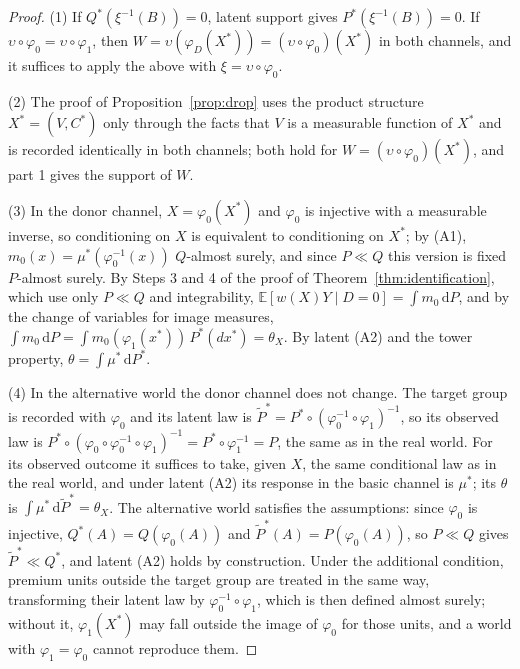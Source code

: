 \documentclass[11pt,a4paper]{article}
\newcommand{\E}{\mathbb{E}}
\newcommand{\dd}{\,\mathrm{d}}
\theoremstyle{plain}
\theoremstyle{definition}
\begin{document}
\begin{proof}
(1) If $Q^*(\xi^{-1}(B))=0$, latent support gives $P^*(\xi^{-1}(B))=0$. If $\upsilon\circ\varphi_0=\upsilon\circ\varphi_1$, then $W=\upsilon(\varphi_D(X^*))=(\upsilon\circ\varphi_0)(X^*)$ in both channels, and it suffices to apply the above with $\xi=\upsilon\circ\varphi_0$.

(2) The proof of Proposition~\ref{prop:drop} uses the product structure $X^*=(V,C^*)$ only through the facts that $V$ is a measurable function of $X^*$ and is recorded identically in both channels; both hold for $W=(\upsilon\circ\varphi_0)(X^*)$, and part 1 gives the support of $W$.

(3) In the donor channel, $X=\varphi_0(X^*)$ and $\varphi_0$ is injective with a measurable inverse, so conditioning on $X$ is equivalent to conditioning on $X^*$; by (A1), $m_0(x)=\mu^*(\varphi_0^{-1}(x))$ $Q$-almost surely, and since $P\ll Q$ this version is fixed $P$-almost surely. By Steps 3 and 4 of the proof of Theorem~\ref{thm:identification}, which use only $P\ll Q$ and integrability, $\E[w(X)Y\mid D=0]=\int m_0\dd P$, and by the change of variables for image measures, $\int m_0\dd P=\int m_0(\varphi_1(x^*))\,P^*(dx^*)=\theta_X$. By latent (A2) and the tower property, $\theta=\int\mu^*\dd P^*$.

(4) In the alternative world the donor channel does not change. The target group is recorded with $\varphi_0$ and its latent law is $\tilde P^*=P^*\circ(\varphi_0^{-1}\circ\varphi_1)^{-1}$, so its observed law is $P^*\circ(\varphi_0\circ\varphi_0^{-1}\circ\varphi_1)^{-1}=P^*\circ\varphi_1^{-1}=P$, the same as in the real world. For its observed outcome it suffices to take, given $X$, the same conditional law as in the real world, and under latent (A2) its response in the basic channel is $\mu^*$; its $\theta$ is $\int\mu^*\dd\tilde P^*=\theta_X$. The alternative world satisfies the assumptions: since $\varphi_0$ is injective, $Q^*(A)=Q(\varphi_0(A))$ and $\tilde P^*(A)=P(\varphi_0(A))$, so $P\ll Q$ gives $\tilde P^*\ll Q^*$, and latent (A2) holds by construction. Under the additional condition, premium units outside the target group are treated in the same way, transforming their latent law by $\varphi_0^{-1}\circ\varphi_1$, which is then defined almost surely; without it, $\varphi_1(X^*)$ may fall outside the image of $\varphi_0$ for those units, and a world with $\varphi_1=\varphi_0$ cannot reproduce them.
\end{proof}
\end{document}
